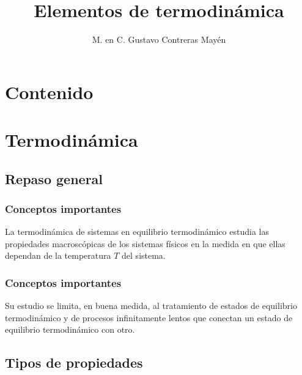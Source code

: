 \documentclass[12pt]{beamer}
\title{\large{Elementos de termodinámica}}
\author{M. en C. Gustavo Contreras Mayén}
\date{}
\begin{document}
\maketitle

\section*{Contenido}


\section{Termodinámica}
\subsection{Repaso general}

\begin{frame}
\frametitle{Conceptos importantes}
La termodinámica de sistemas en equilibrio termodinámico estudia las propiedades macroscópicas de los sistemas físicos en la medida en que ellas dependan de la temperatura $T$ del sistema.
\end{frame}
\begin{frame}
\frametitle{Conceptos importantes}
Su estudio se limita, en buena medida, al tratamiento de estados de equilibrio termodinámico y de procesos infinitamente lentos que conectan un estado de equilibrio termodinámico con otro.
\end{frame}

\subsection{Tipos de propiedades}
\end{document}
